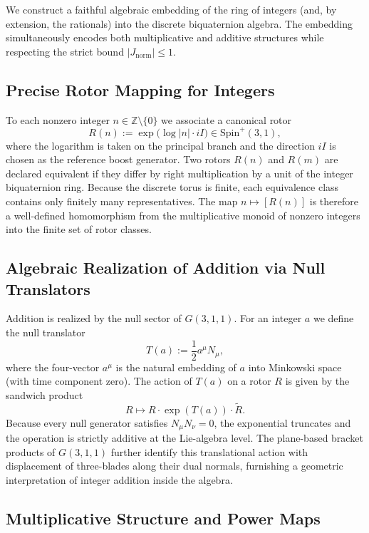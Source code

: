 \documentclass[a4paper]{article}
\theoremstyle{definition}
\theoremstyle{remark}
\newcommand{\Jnorm}{J_{\mathrm{norm}}}
\begin{document}
We construct a faithful algebraic embedding of the ring of integers (and, by extension, the rationals) into the discrete biquaternion algebra. The embedding simultaneously encodes both multiplicative and additive structures while respecting the strict bound \( |\Jnorm| \leq 1 \).

\subsection{Precise Rotor Mapping for Integers}

To each nonzero integer \( n \in \mathbb{Z} \setminus \{0\} \) we associate a canonical rotor
\[
R(n) := \exp\bigl( \log |n| \cdot iI \bigr) \in \mathrm{Spin}^+(3,1),
\]
where the logarithm is taken on the principal branch and the direction \( iI \) is chosen as the reference boost generator. Two rotors \( R(n) \) and \( R(m) \) are declared equivalent if they differ by right multiplication by a unit of the integer biquaternion ring. Because the discrete torus is finite, each equivalence class contains only finitely many representatives. The map \( n \mapsto [R(n)] \) is therefore a well-defined homomorphism from the multiplicative monoid of nonzero integers into the finite set of rotor classes.

\subsection{Algebraic Realization of Addition via Null Translators}

Addition is realized by the null sector of \( G(3,1,1) \). For an integer \( a \) we define the null translator
\[
T(a) := \frac12 a^\mu N_\mu,
\]
where the four-vector \( a^\mu \) is the natural embedding of \( a \) into Minkowski space (with time component zero). The action of \( T(a) \) on a rotor \( R \) is given by the sandwich product
\[
R \mapsto R \cdot \exp(T(a)) \cdot \widetilde{R}.
\]
Because every null generator satisfies \( N_\mu N_\nu = 0 \), the exponential truncates and the operation is strictly additive at the Lie-algebra level. The plane-based bracket products of \( G(3,1,1) \) further identify this translational action with displacement of three-blades along their dual normals, furnishing a geometric interpretation of integer addition inside the algebra.

\subsection{Multiplicative Structure and Power Maps}
\end{document}
